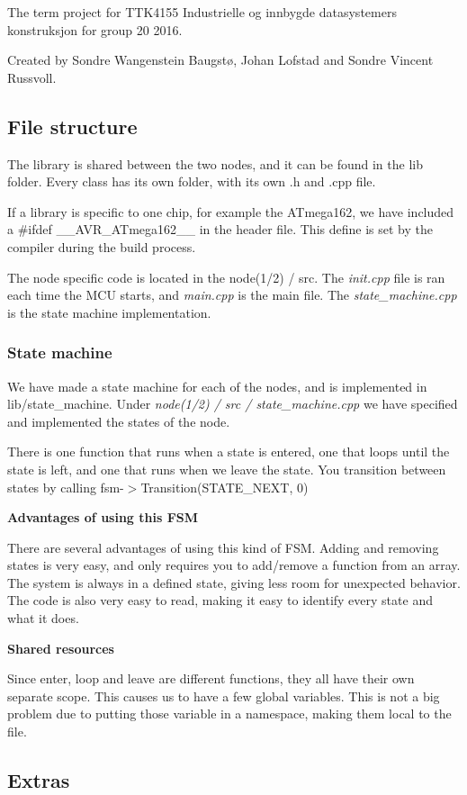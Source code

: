 The term project for T\+T\+K4155 Industrielle og innbygde datasystemers konstruksjon for group 20 2016.

Created by Sondre Wangenstein Baugstø, Johan Lofstad and Sondre Vincent Russvoll.

\subsection*{File structure}

The library is shared between the two nodes, and it can be found in the lib folder. Every class has its own folder, with its own .h and .cpp file.

If a library is specific to one chip, for example the A\+Tmega162, we have included a {\ttfamily \#ifdef \+\_\+\+\_\+\+A\+V\+R\+\_\+\+A\+Tmega162\+\_\+\+\_\+} in the header file. This define is set by the compiler during the build process.

The node specific code is located in the node(1/2) / src. The {\itshape init.\+cpp} file is ran each time the M\+CU starts, and {\itshape main.\+cpp} is the main file. The {\itshape state\+\_\+machine.\+cpp} is the state machine implementation.

\subsubsection*{State machine}

We have made a state machine for each of the nodes, and is implemented in lib/state\+\_\+machine. Under {\itshape node(1/2) / src / state\+\_\+machine.\+cpp} we have specified and implemented the states of the node.

There is one function that runs when a state is entered, one that loops until the state is left, and one that runs when we leave the state. You transition between states by calling {\ttfamily fsm-\/$>$Transition(\+S\+T\+A\+T\+E\+\_\+\+N\+E\+X\+T, 0)}

{\bfseries Advantages of using this F\+SM}

There are several advantages of using this kind of F\+SM. Adding and removing states is very easy, and only requires you to add/remove a function from an array. The system is always in a defined state, giving less room for unexpected behavior. The code is also very easy to read, making it easy to identify every state and what it does.

{\bfseries Shared resources}

Since enter, loop and leave are different functions, they all have their own separate scope. This causes us to have a few global variables. This is not a big problem due to putting those variable in a namespace, making them local to the file. \subsection*{Extras}

